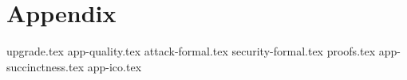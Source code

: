 \appendix
\section*{Appendix}

{upgrade.tex}
{app-quality.tex}
{attack-formal.tex}
{security-formal.tex}
{proofs.tex}
{app-succinctness.tex}
{app-ico.tex}

